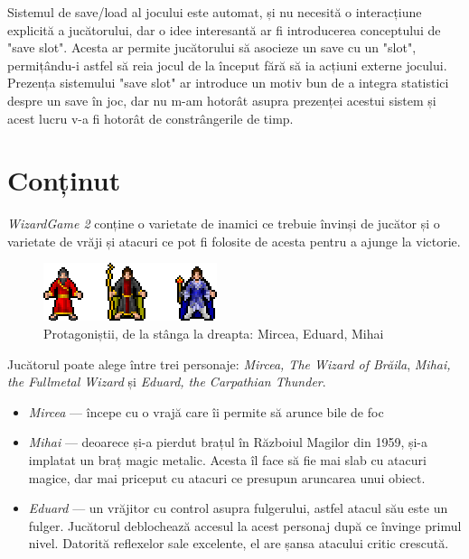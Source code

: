 \documentclass{article}
\begin{document}
    Sistemul de save/load al jocului este automat, și nu necesită o interacțiune explicită a
    jucătorului, dar o idee interesantă ar fi introducerea conceptului de "save slot". Acesta ar
    permite jucătorului să asocieze un save cu un "slot", permițându-i astfel să reia jocul de la
    început fără să ia acțiuni externe jocului. Prezența sistemului "save slot" ar introduce un motiv
    bun de a integra statistici despre un save în joc, dar nu m-am hotorât asupra prezenței acestui
    sistem și acest lucru v-a fi hotorât de constrângerile de timp.

    \section{Conținut}

    \emph{WizardGame 2} conține o varietate de inamici ce trebuie învinși de
    jucător și o varietate de vrăji și atacuri ce pot fi folosite de acesta pentru a ajunge
    la victorie.

    \label{sec:sprites}
    \begin{figure}[h]
        \includegraphics[scale=2]{player-characters}
        \centering
        \caption{Protagoniștii, de la stânga la dreapta: Mircea, Eduard, Mihai}
    \end{figure}

    Jucătorul poate alege între trei personaje: \emph{Mircea, The Wizard of Brăila},
    \emph{Mihai, the Fullmetal Wizard} și \emph{Eduard, the Carpathian Thunder}.
    \begin{itemize}
        \item \emph{Mircea} --- începe cu o vrajă care îi permite să arunce bile de foc
        \item \emph{Mihai} --- deoarece și-a pierdut brațul în Războiul Magilor din 1959,
        și-a implatat un braț magic metalic. Acesta îl face să fie mai slab cu atacuri
        magice, dar mai priceput cu atacuri ce presupun aruncarea unui obiect.
        \item \emph{Eduard} --- un vrăjitor cu control asupra fulgerului, astfel atacul
        său este un fulger. Jucătorul deblochează accesul la acest personaj după ce
        învinge primul nivel. Datorită reflexelor sale excelente, el are șansa atacului critic crescută.
    \end{itemize}
\end{document}
